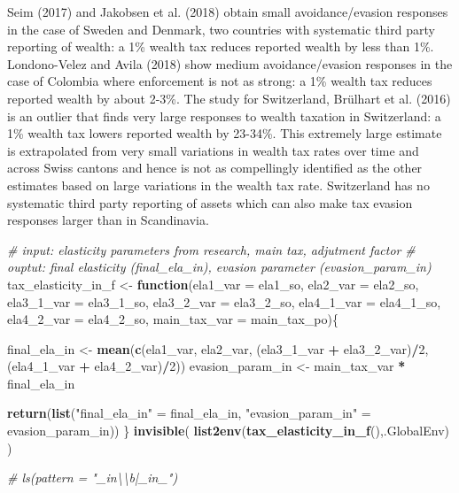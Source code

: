 \documentclass[]{article}
\newenvironment{Shaded}{\begin{snugshade}}{\end{snugshade}}
\newcommand{\CommentTok}[1]{\textcolor[rgb]{0.56,0.35,0.01}{\textit{#1}}}
\newcommand{\ControlFlowTok}[1]{\textcolor[rgb]{0.13,0.29,0.53}{\textbf{#1}}}
\newcommand{\DataTypeTok}[1]{\textcolor[rgb]{0.13,0.29,0.53}{#1}}
\newcommand{\DecValTok}[1]{\textcolor[rgb]{0.00,0.00,0.81}{#1}}
\newcommand{\KeywordTok}[1]{\textcolor[rgb]{0.13,0.29,0.53}{\textbf{#1}}}
\newcommand{\NormalTok}[1]{#1}
\newcommand{\OperatorTok}[1]{\textcolor[rgb]{0.81,0.36,0.00}{\textbf{#1}}}
\newcommand{\StringTok}[1]{\textcolor[rgb]{0.31,0.60,0.02}{#1}}
\begin{document}
Seim (2017) and Jakobsen et al. (2018) obtain small avoidance/evasion
responses in the case of Sweden and Denmark, two countries with
systematic third party reporting of wealth: a 1\% wealth tax reduces
reported wealth by less than 1\%. Londono-Velez and Avila (2018) show
medium avoidance/evasion responses in the case of Colombia where
enforcement is not as strong: a 1\% wealth tax reduces reported wealth
by about 2-3\%. The study for Switzerland, Brülhart et al. (2016) is an
outlier that finds very large responses to wealth taxation in
Switzerland: a 1\% wealth tax lowers reported wealth by 23-34\%. This
extremely large estimate is extrapolated from very small variations in
wealth tax rates over time and across Swiss cantons and hence is not as
compellingly identified as the other estimates based on large variations
in the wealth tax rate. Switzerland has no systematic third party
reporting of assets which can also make tax evasion responses larger
than in Scandinavia.

\begin{Shaded}
\begin{Highlighting}[]
\CommentTok{# input: elasticity parameters from research, main tax, adjutment factor}
\CommentTok{# ouptut: final elasticity (final_ela_in), evasion parameter (evasion_param_in) }
\NormalTok{tax_elasticity_in_f <-}\StringTok{ }\ControlFlowTok{function}\NormalTok{(}\DataTypeTok{ela1_var =}\NormalTok{ ela1_so, }\DataTypeTok{ela2_var =}\NormalTok{ ela2_so, }\DataTypeTok{ela3_1_var =}\NormalTok{ ela3_}\DecValTok{1}\NormalTok{_so, }
                                \DataTypeTok{ela3_2_var =}\NormalTok{ ela3_}\DecValTok{2}\NormalTok{_so, }\DataTypeTok{ela4_1_var =}\NormalTok{ ela4_}\DecValTok{1}\NormalTok{_so, }\DataTypeTok{ela4_2_var =}\NormalTok{ ela4_}\DecValTok{2}\NormalTok{_so,}
                                \DataTypeTok{main_tax_var =}\NormalTok{ main_tax_po)\{}
  
  
  
\NormalTok{    final_ela_in <-}\StringTok{ }\KeywordTok{mean}\NormalTok{(}\KeywordTok{c}\NormalTok{(ela1_var, ela2_var, (ela3_}\DecValTok{1}\NormalTok{_var }\OperatorTok{+}\StringTok{ }\NormalTok{ela3_}\DecValTok{2}\NormalTok{_var)}\OperatorTok{/}\DecValTok{2}\NormalTok{, (ela4_}\DecValTok{1}\NormalTok{_var }\OperatorTok{+}\StringTok{ }\NormalTok{ela4_}\DecValTok{2}\NormalTok{_var)}\OperatorTok{/}\DecValTok{2}\NormalTok{))}
\NormalTok{    evasion_param_in <-}\StringTok{ }\NormalTok{main_tax_var }\OperatorTok{*}\StringTok{ }\NormalTok{final_ela_in}
    
    
    
    \KeywordTok{return}\NormalTok{(}\KeywordTok{list}\NormalTok{(}\StringTok{"final_ela_in"}\NormalTok{ =}\StringTok{ }\NormalTok{final_ela_in, }
                \StringTok{"evasion_param_in"}\NormalTok{ =}\StringTok{ }\NormalTok{evasion_param_in))}
\NormalTok{\}}
\KeywordTok{invisible}\NormalTok{( }\KeywordTok{list2env}\NormalTok{(}\KeywordTok{tax_elasticity_in_f}\NormalTok{(),.GlobalEnv) ) }

\CommentTok{# ls(pattern = "_in\textbackslash{}\textbackslash{}b|_in_") }
\end{Highlighting}
\end{Shaded}
\end{document}
